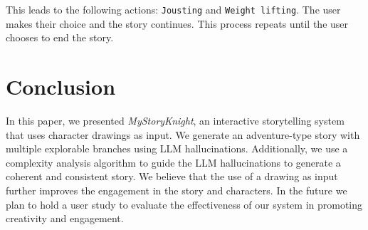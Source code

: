 \documentclass[submit,techrep,english]{ipsj}
\begin{document}
\vspace{10pt} %

This leads to the following actions: \verb|Jousting| and \verb|Weight lifting|. The user makes their choice and the story continues. This process repeats until the user chooses to end the story.

\section{Conclusion}
\label{sec:conclusion}
In this paper, we presented \textit{MyStoryKnight}, an interactive storytelling system that uses character drawings as input. We generate an adventure-type story with multiple explorable branches using LLM hallucinations. Additionally, we use a complexity analysis algorithm to guide the LLM hallucinations to generate a coherent and consistent story. We believe that the use of a drawing as input further improves the engagement in the story and characters. In the future we plan to hold a user study to evaluate the effectiveness of our system in promoting creativity and engagement.





\end{document}
